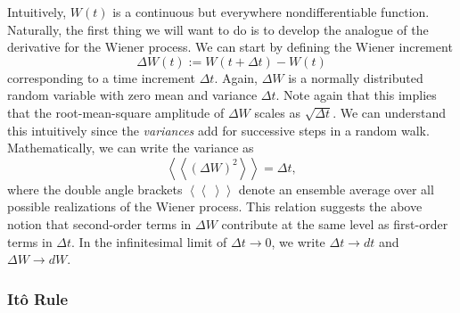 \documentclass[aps,twocolumn,superscriptaddress,footinbib,floatfix,showpacs]{revtex4}
\newcommand{\dlangle}{\left\langle\!\left\langle}
\newcommand{\drangle}{\right\rangle\!\right\rangle}
\def\dexpct#1{\dlangle{#1}\drangle}
\begin{document}
Intuitively, $W(t)$ is a continuous but everywhere nondifferentiable function.
Naturally, the first thing we will want to do is to develop the analogue
of the derivative for the Wiener process.
We can start by defining the Wiener increment
\begin{equation}
  \Delta W(t) := W(t+\Delta t)-W(t)
\end{equation}
corresponding to a time increment $\Delta t$.
Again, $\Delta W$ is a normally distributed random variable with 
zero mean and variance $\Delta t$.
Note again that this implies that the root-mean-square amplitude of
$\Delta W$ scales as $\sqrt{\Delta t}$.  We can understand this
intuitively since the \textit{variances} add for successive steps
in a random walk.  Mathematically, we can write the variance as
\begin{equation}
  \dexpct{(\Delta W)^2} = \Delta t,
\end{equation}
where the double angle brackets $\dexpct{~}$ denote an ensemble
average over all possible realizations of the Wiener process.
This relation suggests the above notion that second-order terms in
$\Delta W$ contribute at the same level as first-order terms in $\Delta t$.
In the infinitesimal limit of $\Delta t\longrightarrow 0$, we 
write $\Delta t\longrightarrow dt$
and $\Delta W\longrightarrow dW$.

\subsubsection{It\^o Rule}
\end{document}
